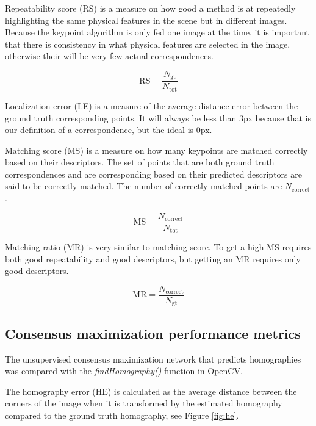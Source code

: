 Repeatability score (RS) is a measure on how good a method is at repeatedly highlighting the same physical features in the scene but in different images. Because the keypoint algorithm is only fed one image at the time, it is important that there is consistency in what physical features are selected in the image, otherwise their will be very few actual correspondences.

\begin{equation}
\mathrm{RS} = \frac{N_{\mathrm{gt}}}{N_{\mathrm{tot}}} 
\end{equation}

Localization error (LE) is a measure of the average distance error between the ground truth corresponding points. It will always be less than 3px because that is our definition of a correspondence, but the ideal is 0px.


Matching score (MS) is a measure on how many keypoints are matched correctly based on their descriptors. The set of points that are both ground truth correspondences and are corresponding based on their predicted descriptors are said to be correctly matched. The number of correctly matched points are $N_{\mathrm{correct}}$.

\begin{equation}
\mathrm{MS}=\frac{N_{\mathrm{correct}}}{N_{\mathrm{tot}}}
\end{equation}

Matching ratio (MR) is very similar to matching score. To get a high MS requires both good repeatability and good descriptors, but getting an MR requires only good descriptors.

\begin{equation}
\mathrm{MR}=\frac{N_{\mathrm{correct}}}{N_{\mathrm{gt}}}
\end{equation}

\subsection{Consensus maximization performance metrics}\label{sec:consensusmetrics}

The unsupervised consensus maximization network that predicts homographies was compared with the \textit{findHomography()} function in OpenCV.

The homography error (HE) is calculated as the average distance between the corners of the image when it is transformed by the estimated homography compared to the ground truth homography, see Figure \ref{fig:he}.


